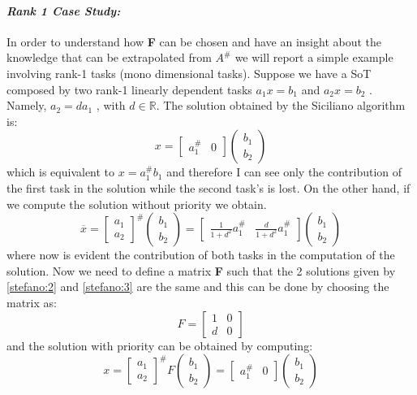 \documentclass[12pt, a4paper]{article}
\newcommand{\R}{\mathbb{R}}
\begin{document}
\paragraph{\textit{Rank 1 Case Study:}}
In order to understand how \textbf{F} can be chosen and have an insight about the knowledge that can be extrapolated from $A^\#$  we will report a simple example involving rank-1 tasks (mono dimensional tasks).
Suppose we have a SoT composed by two rank-1 linearly dependent tasks $a_1x = b_1$ and $a_2x = b_2$ . Namely, $a_2 = da_1$ , with $d \in \R$.
The solution obtained by the Siciliano algorithm is:
\begin{equation}
\label{stefano:3}
x=\begin{bmatrix}
a_1^\# & 0 
\end{bmatrix}
\begin{pmatrix}
b_1 \\ b_2
\end{pmatrix}
\end{equation}
which is equivalent to $x = a_1^\#b_1$ and therefore I can see only the contribution of the first task in the solution while the second task’s is lost.
On the other hand, if we compute the solution without priority we obtain.
\[
\overline{x} = 
\begin{bmatrix}
a_1 \\ a_2
\end{bmatrix}^\#
\begin{pmatrix}
b_1 \\ b_2
\end{pmatrix} = 
\begin{bmatrix}
\frac{1}{1+d^2}a_1^\# & \frac{d}{1+d^2}a_1^\#
\end{bmatrix}
\begin{pmatrix}
b_1 \\ b_2
\end{pmatrix}
\]
where now is evident the contribution of both tasks in the computation of the solution.
Now we need to define a matrix \textbf{F}  such that the 2 solutions given by \eqref{stefano:2} and \eqref{stefano:3} are the same and this can be done by choosing the matrix as:
\[
F = \begin{bmatrix}
1 & 0 \\ d & 0
\end{bmatrix}
\]
and the solution with priority can be obtained by computing:
\[
x = 
\begin{bmatrix}
a_1 \\ a_2
\end{bmatrix}^\#F
\begin{pmatrix}
b_1 \\ b_2
\end{pmatrix}
=\begin{bmatrix}
a_1^\# & 0 
\end{bmatrix}
\begin{pmatrix}
b_1 \\ b_2
\end{pmatrix}
\]
\end{document}
